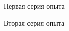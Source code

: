 \documentclass[a4paper,12pt]{article}
\begin{document}
    
    \begin{figure}[!h]
        \caption{Первая серия опыта}
    \end{figure}
    \begin{figure}[!h]
        \caption{Вторая серия опыта}
    \end{figure}
\end{document}
